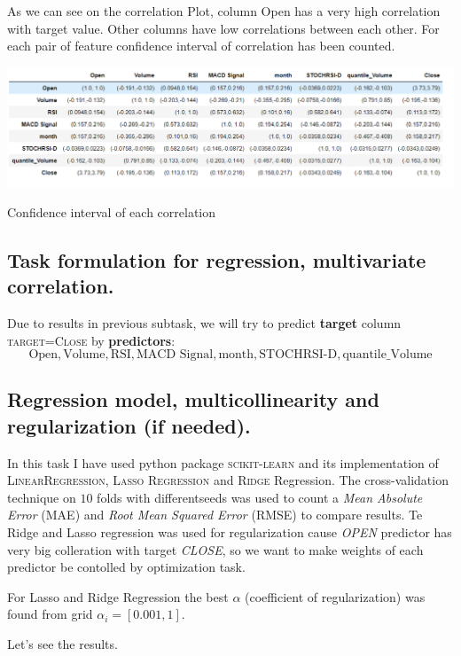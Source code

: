 \documentclass[%
12pt, %
final, %
oneside, %
onecolumn, %
centertags]{article} %
\theoremstyle{plain}
\theoremstyle{definition}
\theoremstyle{remark}
\begin{document}
As we can see on the correlation Plot, column Open has a very high correlation with target value. Other columns have low correlations between each other. For each pair of feature confidence interval of correlation has been counted.

\begin{center}
\includegraphics[scale=0.6]{images/corr_coef.png}

Confidence interval of each correlation
\end{center}

\subsection{Task formulation for regression, multivariate correlation.}

Due to results in previous subtask, we will try to predict \textbf{target} column \textsc{target=Close} by \textbf{predictors}:
$$\text{Open}, \text{Volume}, \text{RSI}, \text{MACD Signal}, \text{month}, \text{STOCHRSI-D}, \text{quantile\_Volume}$$

\subsection{Regression model, multicollinearity and regularization (if needed).}

In this task I have used python package \textsc{scikit-learn} and its implementation of \textsc{LinearRegression}, \textsc{Lasso Regression} and \textsc{Ridge} Regression. The cross-validation technique on $10$ folds with differentseeds was used to count a \textit{Mean Absolute Error} (MAE) and \textit{Root Mean Squared Error} (RMSE) to compare results. Te Ridge and Lasso regression was used for regularization cause \textit{OPEN} predictor has very big colleration with target \textit{CLOSE}, so we want to make weights of each predictor be contolled by optimization task. 

For Lasso and Ridge Regression the best $\alpha$ (coefficient of regularization) was found from grid $\alpha_i = [0.001, 1]$. 

Let's see the results.
\end{document}

